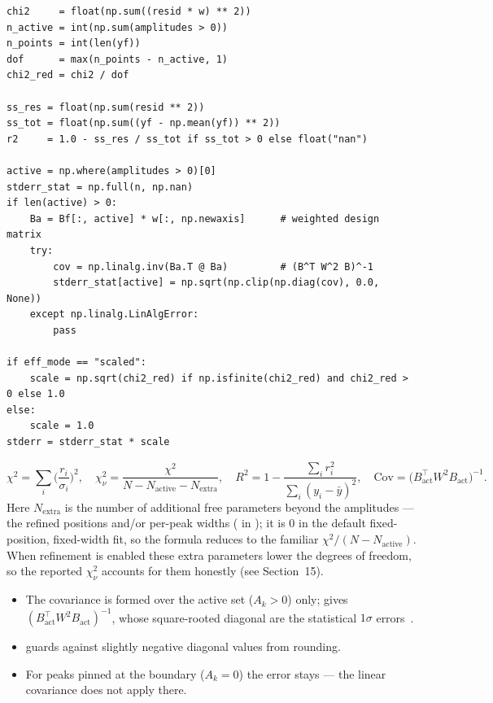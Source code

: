 \documentclass[11pt,a4paper]{article}
\begin{document}
\begin{lstlisting}[style=py]
chi2     = float(np.sum((resid * w) ** 2))
n_active = int(np.sum(amplitudes > 0))
n_points = int(len(yf))
dof      = max(n_points - n_active, 1)
chi2_red = chi2 / dof

ss_res = float(np.sum(resid ** 2))
ss_tot = float(np.sum((yf - np.mean(yf)) ** 2))
r2     = 1.0 - ss_res / ss_tot if ss_tot > 0 else float("nan")

active = np.where(amplitudes > 0)[0]
stderr_stat = np.full(n, np.nan)
if len(active) > 0:
    Ba = Bf[:, active] * w[:, np.newaxis]      # weighted design matrix
    try:
        cov = np.linalg.inv(Ba.T @ Ba)         # (B^T W^2 B)^-1
        stderr_stat[active] = np.sqrt(np.clip(np.diag(cov), 0.0, None))
    except np.linalg.LinAlgError:
        pass

if eff_mode == "scaled":
    scale = np.sqrt(chi2_red) if np.isfinite(chi2_red) and chi2_red > 0 else 1.0
else:
    scale = 1.0
stderr = stderr_stat * scale
\end{lstlisting}
\[
\chi^2 = \sum_i\Big(\frac{r_i}{\sigma_i}\Big)^2,\quad
\chi^2_\nu = \frac{\chi^2}{N-N_{\text{active}}-N_{\text{extra}}},\quad
R^2 = 1 - \frac{\sum_i r_i^2}{\sum_i (y_i-\bar y)^2},\quad
\mathrm{Cov} = \big(B_{\text{act}}^{\top} W^2 B_{\text{act}}\big)^{-1}.
\]
Here $N_{\text{extra}}$ is the number of additional free parameters beyond the
amplitudes --- the refined positions and/or per-peak widths
( in ); it is $0$ in the default
fixed-position, fixed-width fit, so the formula reduces to the familiar
$\chi^2/(N-N_{\text{active}})$. When refinement is enabled these extra
parameters lower the degrees of freedom, so the reported $\chi^2_\nu$ accounts
for them honestly (see Section~15).
\begin{itemize}
\item The covariance is formed over the active set ($A_k > 0$) only;
 gives $(B_{\text{act}}^{\top} W^2 B_{\text{act}})^{-1}$, whose
square-rooted diagonal are the statistical $1\sigma$
errors~\citep{BevingtonRobinson2003,Press2007}.
\item {} guards against slightly negative diagonal
values from rounding.
\item For peaks pinned at the boundary ($A_k = 0$) the error stays  ---
the linear covariance does not apply there.
\end{itemize}
\end{document}

